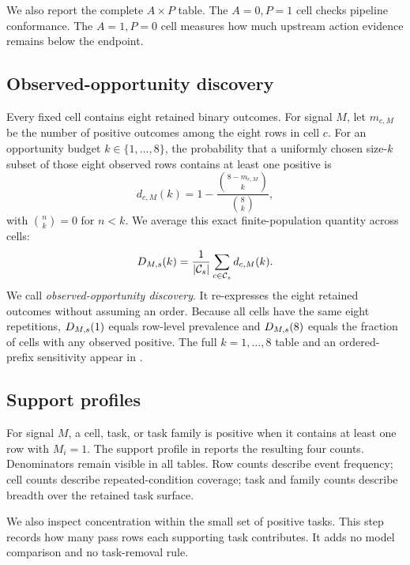 We also report the complete $A\times P$ table. The $A=0,P=1$ cell checks pipeline conformance. The $A=1,P=0$ cell measures how much upstream action evidence remains below the endpoint.

\subsection{Observed-opportunity discovery}

Every fixed cell contains eight retained binary outcomes. For signal $M$, let $m_{c,M}$ be the number of positive outcomes among the eight rows in cell $c$. For an opportunity budget $k\in\{1,\ldots,8\}$, the probability that a uniformly chosen size-$k$ subset of those eight observed rows contains at least one positive is
\begin{equation}
 d_{c,M}(k)
 =
 1-
 \frac{\binom{8-m_{c,M}}{k}}{\binom{8}{k}},
\label{eq:cell-discovery}
\end{equation}
with $\binom{n}{k}=0$ for $n<k$. We average this exact finite-population quantity across cells:
\begin{equation}
D_{M,s}(k)
=
\frac{1}{|\mathcal C_s|}
\sum_{c\in\mathcal C_s}d_{c,M}(k).
\label{eq:discovery}
\end{equation}
We call  \emph{observed-opportunity discovery}. It re-expresses the eight retained outcomes without assuming an order. Because all cells have the same eight repetitions, $D_{M,s}(1)$ equals row-level prevalence and $D_{M,s}(8)$ equals the fraction of cells with any observed positive. The full $k=1,\ldots,8$ table and an ordered-prefix sensitivity appear in .

\subsection{Support profiles}

For signal $M$, a cell, task, or task family is positive when it contains at least one row with $M_i=1$. The support profile in  reports the resulting four counts. Denominators remain visible in all tables. Row counts describe event frequency; cell counts describe repeated-condition coverage; task and family counts describe breadth over the retained task surface.

We also inspect concentration within the small set of positive tasks. This step records how many pass rows each supporting task contributes. It adds no model comparison and no task-removal rule.

